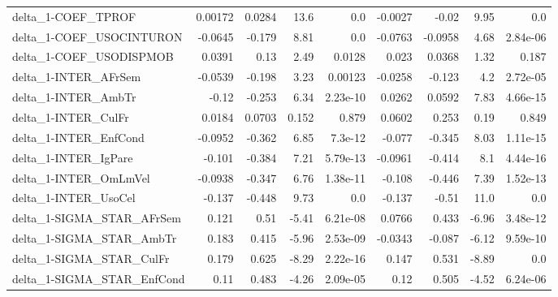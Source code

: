 \begin{tabular}{lrrrrrrrr}
delta\_1-COEF\_TPROF                    &     0.00172 &       0.0284 &    13.6 &      0.0 &    -0.0027 &       -0.02 &         9.95 &           0.0 \\
delta\_1-COEF\_USOCINTURON              &     -0.0645 &       -0.179 &    8.81 &      0.0 &    -0.0763 &     -0.0958 &         4.68 &      2.84e-06 \\
delta\_1-COEF\_USODISPMOB               &      0.0391 &         0.13 &    2.49 &   0.0128 &      0.023 &      0.0368 &         1.32 &         0.187 \\
delta\_1-INTER\_AFrSem                  &     -0.0539 &       -0.198 &    3.23 &  0.00123 &    -0.0258 &      -0.123 &          4.2 &      2.72e-05 \\
delta\_1-INTER\_AmbTr                   &       -0.12 &       -0.253 &    6.34 & 2.23e-10 &     0.0262 &      0.0592 &         7.83 &      4.66e-15 \\
delta\_1-INTER\_CulFr                   &      0.0184 &       0.0703 &   0.152 &    0.879 &     0.0602 &       0.253 &         0.19 &         0.849 \\
delta\_1-INTER\_EnfCond                 &     -0.0952 &       -0.362 &    6.85 &  7.3e-12 &     -0.077 &      -0.345 &         8.03 &      1.11e-15 \\
delta\_1-INTER\_IgPare                  &      -0.101 &       -0.384 &    7.21 & 5.79e-13 &    -0.0961 &      -0.414 &          8.1 &      4.44e-16 \\
delta\_1-INTER\_OmLmVel                 &     -0.0938 &       -0.347 &    6.76 & 1.38e-11 &     -0.108 &      -0.446 &         7.39 &      1.52e-13 \\
delta\_1-INTER\_UsoCel                  &      -0.137 &       -0.448 &    9.73 &      0.0 &     -0.137 &       -0.51 &         11.0 &           0.0 \\
delta\_1-SIGMA\_STAR\_AFrSem             &       0.121 &         0.51 &   -5.41 & 6.21e-08 &     0.0766 &       0.433 &        -6.96 &      3.48e-12 \\
delta\_1-SIGMA\_STAR\_AmbTr              &       0.183 &        0.415 &   -5.96 & 2.53e-09 &    -0.0343 &      -0.087 &        -6.12 &      9.59e-10 \\
delta\_1-SIGMA\_STAR\_CulFr              &       0.179 &        0.625 &   -8.29 & 2.22e-16 &      0.147 &       0.531 &        -8.89 &           0.0 \\
delta\_1-SIGMA\_STAR\_EnfCond            &        0.11 &        0.483 &   -4.26 & 2.09e-05 &       0.12 &       0.505 &        -4.52 &      6.24e-06 \\

\end{tabular}
